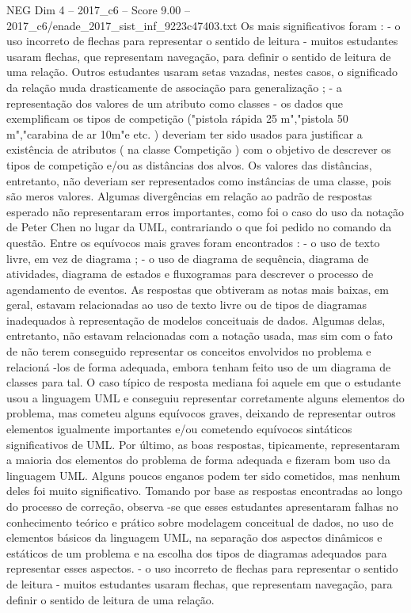 \begin{textsample}{NEG Dim 4 – 2017\_c6 – Score 9.00 – 2017\_c6/enade\_2017\_sist\_inf\_9223c47403.txt}
Os mais significativos foram : - o uso incorreto de flechas para representar o sentido de leitura - muitos estudantes usaram flechas, que representam navegação, para definir o sentido de leitura de uma relação.
Outros estudantes usaram setas vazadas, nestes casos, o significado da relação muda drasticamente de associação para generalização ; - a representação dos valores de um atributo como classes - os dados que exemplificam os tipos de competição ("pistola rápida 25 m","pistola 50 m","carabina de ar 10m"e etc. ) deveriam ter sido usados para justificar a existência de atributos ( na classe Competição ) com o objetivo de descrever os tipos de competição e/ou as distâncias dos alvos.
Os valores das distâncias, entretanto, não deveriam ser representados como instâncias de uma classe, pois são meros valores.
Algumas divergências em relação ao padrão de respostas esperado não representaram erros importantes, como foi o caso do uso da notação de Peter Chen no lugar da UML, contrariando o que foi pedido no comando da questão.
Entre os equívocos mais graves foram encontrados : - o uso de texto livre, em vez de diagrama ; - o uso de diagrama de sequência, diagrama de atividades, diagrama de estados e fluxogramas para descrever o processo de agendamento de eventos.
As respostas que obtiveram as notas mais baixas, em geral, estavam relacionadas ao uso de texto livre ou de tipos de diagramas inadequados à representação de modelos conceituais de dados.
Algumas delas, entretanto, não estavam relacionadas com a notação usada, mas sim com o fato de não terem conseguido representar os conceitos envolvidos no problema e relacioná -los de forma adequada, embora tenham feito uso de um diagrama de classes para tal.
O caso típico de resposta mediana foi aquele em que o estudante usou a linguagem UML e conseguiu representar corretamente alguns elementos do problema, mas cometeu alguns equívocos graves, deixando de representar outros elementos igualmente importantes e/ou cometendo equívocos sintáticos significativos de UML.
Por último, as boas respostas, tipicamente, representaram a maioria dos elementos do problema de forma adequada e fizeram bom uso da linguagem UML.
Alguns poucos enganos podem ter sido cometidos, mas nenhum deles foi muito significativo.
Tomando por base as respostas encontradas ao longo do processo de correção, observa -se que esses estudantes apresentaram falhas no conhecimento teórico e prático sobre modelagem conceitual de dados, no uso de elementos básicos da linguagem UML, na separação dos aspectos dinâmicos e estáticos de um problema e na escolha dos tipos de diagramas adequados para representar esses aspectos. - o uso incorreto de flechas para representar o sentido de leitura - muitos estudantes usaram flechas, que representam navegação, para definir o sentido de leitura de uma relação.

\end{textsample}
